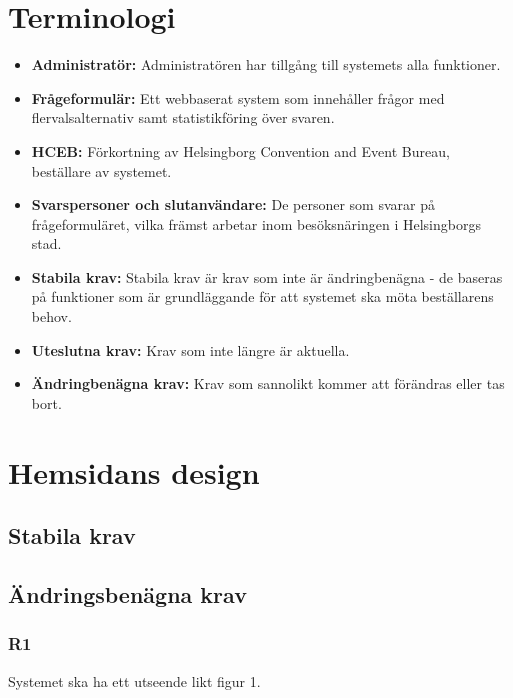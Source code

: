 \documentclass{article}
\begin{document}
    \section{Terminologi}
    \begin{itemize}
        \item \textbf{Administratör:} Administratören har tillgång till systemets alla funktioner.
         \item \textbf{Frågeformulär:} Ett webbaserat system som innehåller frågor med flervalsalternativ samt statistikföring över svaren.
        \item \textbf{HCEB:} Förkortning av Helsingborg Convention and Event Bureau, beställare av systemet.
        \item \textbf{Svarspersoner och slutanvändare:}  De personer som svarar på frågeformuläret, vilka främst arbetar inom besöksnäringen i Helsingborgs stad. 
        \item\textbf{Stabila krav:}  Stabila krav är krav som inte är ändringbenägna - de baseras på funktioner som är grundläggande för att systemet ska möta beställarens behov.
         \item \textbf{Uteslutna krav:}  Krav som inte längre är aktuella.
        \item \textbf{Ändringbenägna krav:}  Krav som sannolikt kommer att förändras eller tas bort.
       
    \end{itemize}
    \newpage
    \section{Hemsidans design}
    
    \subsection*{Stabila krav}
     
    \subsection*{Ändringsbenägna krav}
     \subsubsection*{R1}
    Systemet ska ha ett utseende likt figur 1.
    
\end{document}
